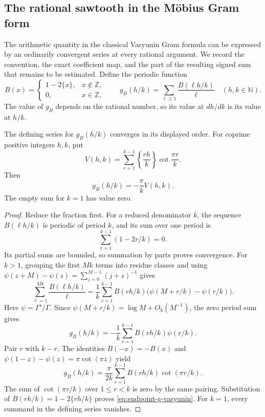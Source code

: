 \subsection{The rational sawtooth in the M\"obius Gram form}
\label{subsec:endpoint-sawtooth-gram}

The arithmetic quantity in the classical Vasyunin Gram formula can
be expressed by an ordinarily convergent series at every rational
argument. We record the convention, the exact coefficient map, and
the part of the resulting signed sum that remains to be estimated.
Define the periodic function
\[
 B(x)=\begin{cases}1-2\{x\},&x\notin\mathbb Z,\\
                   0,&x\in\mathbb Z,
       \end{cases}
 \qquad
 g_B(h/k)=\sum_{\ell\ge1}\frac{B(\ell h/k)}{\ell}
 \quad(h,k\in\mathbb N).
\]
The value of \(g_B\) depends on the rational number, so its value
at \(dh/dk\) is its value at \(h/k\).

\begin{lemma}
\label{lem:endpoint-rational-sawtooth}
The defining series for \(g_B(h/k)\) converges in its displayed
order. For coprime positive integers \(h,k\), put
\[
 V(h,k)=\sum_{r=1}^{k-1}\left\{\frac{rh}{k}\right\}
                       \cot\frac{\pi r}{k}.
\]
Then
\begin{equation}\label{eq:endpoint-g-vasyunin}
 g_B(h/k)=-\frac{\pi}{k}V(h,k).
\end{equation}
The empty sum for \(k=1\) has value zero.
\end{lemma}

\begin{proof}
Reduce the fraction first. For a reduced denominator \(k\), the
sequence \(B(\ell h/k)\) is periodic of period \(k\), and its
sum over one period is
\[
 \sum_{r=1}^{k-1}(1-2r/k)=0.
\]
Its partial sums are bounded, so summation by parts proves convergence.
For \(k>1\), grouping the first \(Mk\) terms into residue classes
and using \(\psi(z+M)-\psi(z)=\sum_{j=0}^{M-1}(j+z)^{-1}\)
gives
\[
 \sum_{\ell=1}^{Mk}\frac{B(\ell h/k)}{\ell}
 =\frac1k\sum_{r=1}^{k-1}B(rh/k)
                   \bigl(\psi(M+r/k)-\psi(r/k)\bigr).
\]
Here \(\psi=\Gamma'/\Gamma\). Since
\(\psi(M+r/k)=\log M+O_k(M^{-1})\), the zero period sum gives
\[
 g_B(h/k)=-\frac1k\sum_{r=1}^{k-1}B(rh/k)\psi(r/k).
\]
Pair \(r\) with \(k-r\). The identities
\(B(-x)=-B(x)\) and
\(\psi(1-z)-\psi(z)=\pi\cot(\pi z)\) yield
\[
 g_B(h/k)=\frac{\pi}{2k}
             \sum_{r=1}^{k-1}B(rh/k)\cot(\pi r/k).
\]
The sum of \(\cot(\pi r/k)\) over \(1\le r<k\) is zero
by the same pairing. Substitution of
\(B(rh/k)=1-2\{rh/k\}\) proves
\eqref{eq:endpoint-g-vasyunin}. For \(k=1\), every summand in
the defining series vanishes.
\end{proof}

